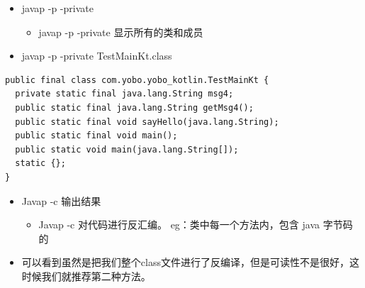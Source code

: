 \documentclass[9pt, b5paper]{article}
\begin{document}
\begin{itemize}
\item javap -p -private 
\begin{itemize}
\item javap -p -private  显示所有的类和成员
\end{itemize}
\item javap -p -private  TestMainKt.class
\end{itemize}
\begin{verbatim}
public final class com.yobo.yobo_kotlin.TestMainKt {
  private static final java.lang.String msg4;
  public static final java.lang.String getMsg4();
  public static final void sayHello(java.lang.String);
  public static final void main();
  public static void main(java.lang.String[]);
  static {};
}
\end{verbatim}
\begin{itemize}
\item Javap -c 输出结果
\begin{itemize}
\item Javap -c    对代码进行反汇编。 eg：类中每一个方法内，包含 java 字节码的
\end{itemize}
\item 可以看到虽然是把我们整个class文件进行了反编译，但是可读性不是很好，这时候我们就推荐第二种方法。
\end{itemize}
\end{document}

